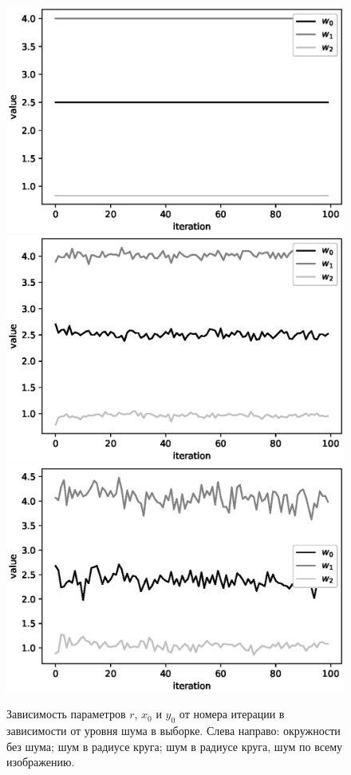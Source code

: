 \documentclass[12pt]{a&t}
\begin{document}
\begin{figure}[h!]
\begin{center}
	\includegraphics[height = 0.2\textheight]{900noise.eps}
	\includegraphics[height = 0.2\textheight]{901noise.eps}\\
	\includegraphics[height = 0.2\textheight]{902noise.eps}
\end{center}
\caption{Зависимость параметров $r$, $x_0$ и $y_0$ от номера итерации в зависимости от уровня шума в выборке. Слева направо: окружности без шума; шум в радиусе круга; шум в радиусе круга, шум по всему изображению.}
\label{ce:fig4}
\end{figure}
\end{document}
